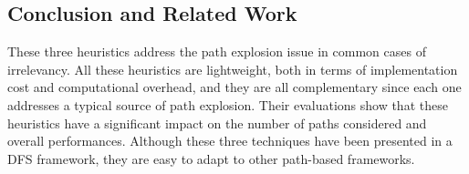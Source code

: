\subsection{Conclusion and Related Work}
These three heuristics address the path explosion issue in common cases of irrelevancy. All these heuristics are lightweight, both in terms of implementation cost and computational overhead, and they are all complementary since each one addresses a typical source of path explosion.
Their evaluations show that these heuristics have a significant impact on the number of paths considered and overall performances. Although these three techniques have been presented in a DFS framework, they are easy to adapt to other path-based frameworks. 

